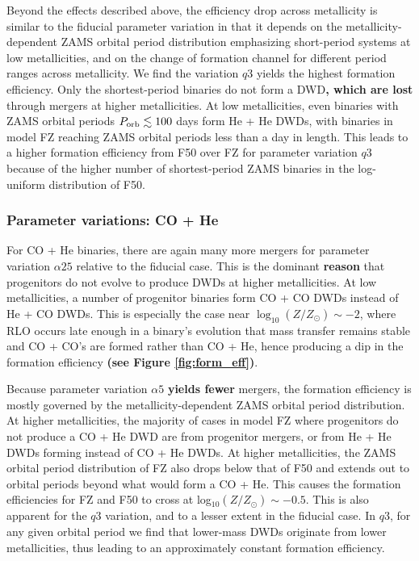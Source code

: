 \documentclass[twocolumn, linenumbers]{aastex631}
\begin{document}
Beyond the effects described above, the efficiency drop across metallicity 
is similar to the fiducial parameter variation in that it depends on the 
metallicity-dependent ZAMS orbital period distribution emphasizing 
short-period systems at low metallicities, and on the change of formation 
channel for different period ranges across metallicity. We find the 
variation $q3$ yields the highest formation efficiency. Only the 
shortest-period binaries do not form a DWD\textbf{, which are lost} 
through mergers at higher metallicities. At low metallicities, even 
binaries with ZAMS orbital periods $P_{\rm{orb}}\lesssim 100$ days form He 
+ He DWDs, with binaries in model FZ reaching ZAMS orbital periods less 
than a day in length. This leads to a higher formation efficiency from F50 
over FZ for parameter variation $q3$ because of the higher number of 
shortest-period ZAMS binaries in the log-uniform distribution of F50.

\subsubsection{\textbf{Parameter variations: CO + 
He}}\label{formeff_COHe_vars}
For CO + He binaries, there are again many more mergers for parameter 
variation $\alpha25$ relative to the fiducial case. This is the dominant 
\textbf{reason} that progenitors do not evolve to produce DWDs at higher 
metallicities. At low metallicities, a number of progenitor binaries form 
CO + CO DWDs instead of He + CO DWDs. This is especially the case near 
$\log_{10}(Z/Z_\odot)\sim -2$, where RLO occurs late enough in a binary's 
evolution that mass transfer remains stable and CO + CO's are formed 
rather than CO + He, hence producing a dip in the formation efficiency 
\textbf{(see Figure \ref{fig:form_eff})}.


Because parameter variation $\alpha5$ \textbf{yields fewer} mergers, the 
formation efficiency is mostly governed by the metallicity-dependent ZAMS 
orbital period distribution. At higher metallicities, the majority of 
cases in model FZ where progenitors do not produce a CO + He DWD are from 
progenitor mergers, or from He + He DWDs forming instead of CO + He DWDs. 
At higher metallicities, the ZAMS orbital period distribution of FZ also 
drops below that of F50 and extends out to orbital periods beyond what 
would form a CO + He. This causes the formation efficiencies for FZ and 
F50 to cross at log$_{10}(Z/Z_\odot)\sim-0.5$. This is also apparent for 
the $q3$ variation, and to a lesser extent in the fiducial case. In $q3$, 
for any given orbital period we find that lower-mass DWDs originate from 
lower metallicities, thus leading to an approximately constant formation 
efficiency.
\end{document}
